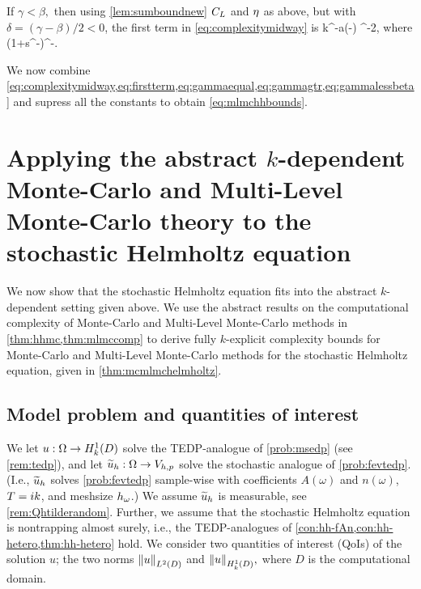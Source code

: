 If $\gamma < \beta,$ then using \cref{lem:sumboundnew} $C_{L}$ and $\eta$ as above, but with $\delta = (\gamma-\beta)/2 < 0$, the first term in \eqref{eq:complexitymidway} is
\beq\label{eq:gammalessbeta}
\Cgammalessbeta k^{\tau  -a\mleft(\beta-\gamma\mright)} \eps^{-2},
\eeq
where
\beqs\label{eq:gammaless}
\Cgammalessbeta {}\ct \cth \mleft(1+s^{-\gamma}\mright)\Ccoarse^{\beta-\gamma}.
\eeqs

We now combine \cref{eq:complexitymidway,eq:firstterm,eq:gammaequal,eq:gammagtr,eq:gammalessbeta} and supress all the constants to obtain \cref{eq:mlmchhbounds}.
\epf



\section[Application to the stochastic Helmholtz equation]{Applying the abstract $k$-dependent Monte-Carlo and Multi-Level Monte-Carlo theory to the stochastic Helmholtz equation}\label{sec:mlmcapplying}

We now show that the stochastic Helmholtz equation fits into the abstract $k$-dependent setting given above. We use the abstract results on the computational complexity of Monte-Carlo and Multi-Level Monte-Carlo methods in \cref{thm:hhmc,thm:mlmccomp} to derive fully $k$-explicit complexity bounds for Monte-Carlo and Multi-Level Monte-Carlo methods for the stochastic Helmholtz equation, given in \cref{thm:mcmlmchelmholtz}.

\subsection{Model problem and quantities of interest}\label{sec:mlmcmodel}

We let $u:\Omega\rightarrow\HokD$ solve the TEDP-analogue of \cref{prob:msedp} (see \cref{rem:tedp}), and let $\widetilde{u}_{h}:\Omega\rightarrow V_{h,p}$ solve the stochastic analogue of \cref{prob:fevtedp}. (I.e., $\widetilde{u}_{h}$ solves \cref{prob:fevtedp} sample-wise with coefficients $A(\omega)$ and $n(\omega)$, $T = ik$, and meshsize $h_{\omega}$.) We assume $\widetilde{u}_{h}$ is measurable, see \cref{rem:Qhtilderandom}. Further, we assume that the stochastic Helmholtz equation is nontrapping almost surely, i.e., the TEDP-analogues of \cref{con:hh-fAn,con:hh-hetero,thm:hh-hetero} hold. We consider two quantities of interest (QoIs) of the solution $u$; the two norms $\NLtD{u}$ and $\NHokD{u},$ where $D$ is the computational domain.

